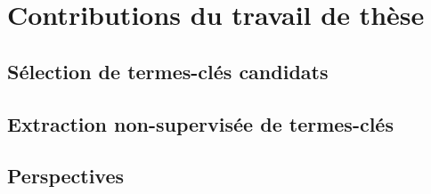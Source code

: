 \chapter{Contributions du travail de thèse}
  \section{Sélection de termes-clés candidats}
  \section{Extraction non-supervisée de termes-clés}
  \section{Perspectives}

